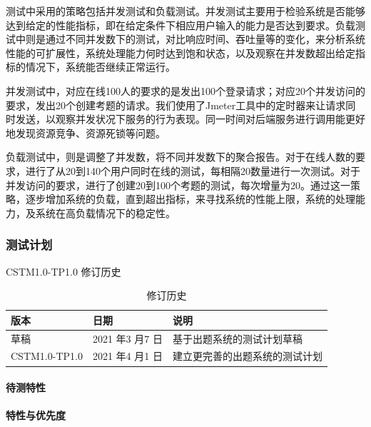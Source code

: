 \documentclass[hyperref, a4paper]{ctexart}
\let\oldparagraph\paragraph
\renewcommand{\paragraph}[1]{\oldparagraph{#1}\mbox{}}
\begin{document}
测试中采用的策略包括并发测试和负载测试。并发测试主要用于检验系统是否能够达到给定的性能指标，即在给定条件下相应用户输入的能力是否达到要求。负载测试中则是通过不同并发数下的测试，对比响应时间、吞吐量等的变化，来分析系统性能的可扩展性，系统处理能力何时达到饱和状态，以及观察在并发数超出给定指标的情况下，系统能否继续正常运行。

并发测试中，对应在线100人的要求的是发出100个登录请求；对应20个并发访问的要求，发出20个创建考题的请求。我们使用了Jmeter工具中的定时器来让请求同时发送，以观察并发状况下服务的行为表现。同一时间对后端服务进行调用能更好地发现资源竞争、资源死锁等问题。

负载测试中，则是调整了并发数，将不同并发数下的聚合报告。对于在线人数的要求，进行了从20到140个用户同时在线的测试，每相隔20数量进行一次测试。对于并发访问的要求，进行了创建20到100个考题的测试，每次增量为20。通过这一策略，逐步增加系统的负载，直到超出指标，来寻找系统的性能上限，系统的处理能力，及系统在高负载情况下的稳定性。

\hypertarget{ux6d4bux8bd5ux8ba1ux5212}{%
\subsubsection{测试计划}\label{ux6d4bux8bd5ux8ba1ux5212}}

CSTM1.0-TP1.0 修订历史

\begin{table}[h]
\centering
\caption{修订历史}
\begin{tabular}{|p{2cm}|p{3.3cm}|p{5cm}|}
\hline
版本 & 日期 & 说明\\
\hline
草稿 & 2021 年3 月7 日 & 基于出题系统的测试计划草稿\\
\hline
CSTM1.0-TP1.0 & 2021 年4 月1 日 & 建立更完善的出题系统的测试计划\\
\hline
\end{tabular}
\end{table}

\hypertarget{ux5f85ux6d4bux7279ux6027}{%
\paragraph{待测特性}\label{ux5f85ux6d4bux7279ux6027}}

\hypertarget{ux7279ux6027ux4e0eux4f18ux5148ux5ea6}{%
\paragraph{特性与优先度}\label{ux7279ux6027ux4e0eux4f18ux5148ux5ea6}}
\end{document}
